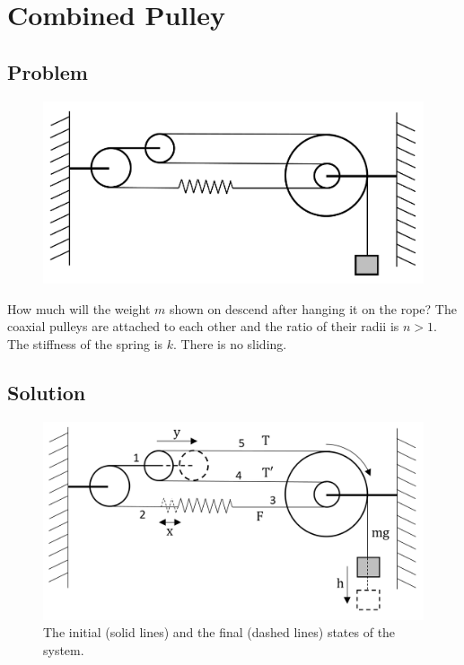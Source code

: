 \section*{Combined Pulley}

\subsection*{Problem}
\begin{figure}
    \centering
    \vspace{-.75cm}
    \includegraphics[width = \textwidth / 2]{P-1}
    \caption{}
    \vspace{-4cm}
\end{figure}

How much will the weight $m$ shown on  descend
after hanging it on the rope?
The coaxial pulleys are attached to each other
and the ratio of their radii is $n > 1$.
The stiffness of the spring is $k$.
There is no sliding.

\vspace{2cm}

\subsection*{Solution}

\begin{figure}
    \centering
    \vspace{-.75cm}
    \includegraphics[width = .6\textwidth]{S-1}
    \caption{The initial (solid lines) and the final (dashed lines)
        states of the system.}
    \vspace{-1.5cm}
\end{figure}

